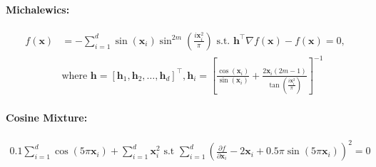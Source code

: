 \paragraph{Michalewics:}
\begin{align*}
        f(\mathbf{x}) &= -\sum_{i=1}^{d} \sin(\mathbf{x}_i) \sin^{2m}\left(\frac{i\mathbf{x}_i^2}{\pi}\right) \text{ s.t. } \mathbf{h}^\top \nabla f(\mathbf{x}) - f(\mathbf{x}) = 0,\\ & \text{where } \mathbf{h} = [\mathbf{h}_1, \mathbf{h}_2, \dots, \mathbf{h}_d]^\top, \mathbf{h}_i = \left[\frac{\cos(\mathbf{x}_i)}{\sin(\mathbf{x}_i)} + \frac{2\mathbf{x}_i (2m-1)}{\tan(\frac{i\mathbf{x}_i^2}{\pi})}\right]^{-1}
\end{align*}
\paragraph{Cosine Mixture:}
\begin{align*}
    0.1 \sum_{i=1}^d \cos(5\pi\mathbf{x}_i) + \sum_{i=1}^d \mathbf{x}_i^2 \text{ s.t } \sum_{i=1}^d \left(\frac{\partial f}{\partial \mathbf{x}_i} - 2\mathbf{x}_i + 0.5\pi\sin(5\pi\mathbf{x}_i) \right)^2 = 0
\end{align*}


